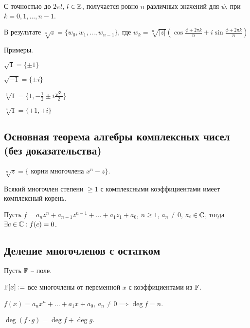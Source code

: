 С точностью до $2 \pi l$, $l \in \mathbb{Z}$, получается ровно $n$ различных значений для $\psi$, при $k = 0, 1, \dots, n-1$.

В результате $\sqrt[n]{z} = \{w_0, w_1, \dots, w_{n-1} \}$, где $w_k = \sqrt[n]{|z|}\left(\cos \frac{\phi + 2 \pi k}{n} + i \sin \frac{\phi + 2 \pi k}{n}\right)$

\begin{comment}
    Числа $w_0, w_1, \dots, w_{n-1}$ лежат в вершинах правильного n-угольника с центром в начале координат.
\end{comment}

Примеры.

$\sqrt{1} = \{\pm 1\}$

$\sqrt{-1} = \{\pm i\}$

$\sqrt[3]{1} = \{1, -\frac{1}{2} \pm i \frac{\sqrt{3}}{2} \}$

$\sqrt[4]{1} = \{ \pm 1, \pm i \}$


\subsection{Основная теорема алгебры комплексных чисел (без доказательства)}

$\sqrt[n]{z} = \{$ корни многочлена $x^n - z \}$.

\begin{theorem}
    Всякий многочлен степени $\geq 1$ с комплексными коэффициентами имеет комплексный корень.
\end{theorem}

Пусть $f = a_n z^n + a_{n - 1} z^{n - 1} + \dots + a_1 z_1 + a_0$, $n \geq 1$, $a_n \neq 0$, $a_i \in \mathbb{C}$, тогда $\exists c \in \mathbb{C} : f(c) = 0$.

\begin{comment}
    Свойство поля $\CC$, сформулированное в теореме, называется \textit{алгебраической замкнутостью}.
\end{comment}

\subsection{Деление многочленов с остатком}

Пусть $\mathbb{F}$ -- поле.

$\mathbb{F}[x] := $ все многочлены от переменной $x$ с коэффициентами из $\mathbb{F}$.

$f(x) = a_n x^n + \dots + a_1 x + a_0$, $a_n \neq 0 \implies \deg f = n$.

$\deg(f \cdot g) = \deg f + \deg g$.

